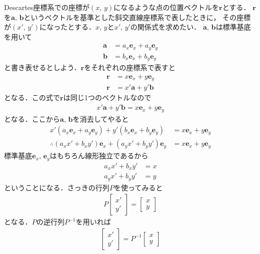 Descartes座標系での座標が$(x, \, y)$になるような点の位置ベクトルを$\bm{r}$とする．
$\bm{r}$を$\bm{a}, \, \bm{b}$というベクトルを基準とした斜交直線座標系で表したときに，
その座標が$(x', \, y')$になったとする．$x, \, y$と$x', \, y'$の関係式を求めたい．
$\bm{a}, \, \bm{b}$は標準基底を用いて
\begin{align*}
\bm{a} & = a_x \bm{e}_x + a_y \bm{e}_y \\
\bm{b} & = b_x \bm{e}_x + b_y \bm{e}_y
\end{align*}
と書き表せるとしよう．$\bm{r}$をそれぞれの座標系で表すと
\begin{align*}
\bm{r} & = x \bm{e}_x + y \bm{e}_y \\
\bm{r} & = x' \bm{a} + y' \bm{b} 
\end{align*}
となる．この式で$\bm{r}$は同じ1つのベクトルなので
\begin{align*}
x' \bm{a} + y' \bm{b} = x \bm{e}_x + y \bm{e}_y 
\end{align*}
となる．ここから$\bm{a}, \, \bm{b}$を消去してやると
\begin{align*}
x' ( a_x \bm{e}_x + a_y \bm{e}_y ) + y' ( b_x \bm{e}_x + b_y \bm{e}_y ) & = x \bm{e}_x + y \bm{e}_y \\
\therefore (a_x x' + b_x y' ) \bm{e}_x  + ( a_y x' + b_y y' ) \bm{e}_y & = x \bm{e}_x + y \bm{e}_y
\end{align*}
標準基底$\bm{e}_x, \, \bm{e}_y$はもちろん線形独立であるから
\begin{align*}
a_x x' + b_x y' & = x \\
a_y x' + b_y y' &= y
\end{align*}
ということになる．さっきの行列$P$を使ってみると
\begin{align*}
P 
\left[
\begin{array}{c}
x' \\
y'
\end{array}
\right]
= 
\left[
\begin{array}{c}
x \\
y
\end{array}
\right]
\end{align*}
となる．$P$の逆行列$P^{-1}$を用いれば
\begin{align*}
\left[
\begin{array}{c}
x' \\
y' 
\end{array}
\right]
= P^{-1}
\left[
\begin{array}{c}
x \\
y
\end{array}
\right]
\end{align*}
